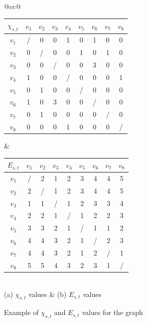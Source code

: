 \documentclass{sig-alternate}
\begin{document}
\begin{figure}[hbt]
    \center
    \begin{tabular}{@{}cc@{}}
        \begin{tabular}{|@{ }c@{ }|@{ }c@{ }c@{ }c@{ }c@{ }c@{ }c@{ }c@{ }c@{ }|}
            \hline
            $\chi_{s,t}$	& $v_1$	& $v_2$	& $v_3$	& $v_4$	& $v_5$	& $v_6$	& $v_7$ & $v_8$ \\\hline
            $v_1$			& /	& 0	& 0	& 1	& 0	& 1	& 0	& 0	 \\
            $v_2$			& 0	& /	& 0	& 0	& 1	& 0	& 1	& 0	 \\
            $v_3$			& 0	& 0	& /	& 0	& 0	& 3	& 0	& 0	 \\
            $v_4$			& 1	& 0	& 0	& /	& 0	& 0	& 0	& 1	 \\
            $v_5$			& 0	& 1	& 0	& 0	& /	& 0	& 0	& 0	 \\
            $v_6$			& 1	& 0	& 3	& 0	& 0	& /	& 0	& 0	 \\
            $v_7$			& 0	& 1	& 0	& 0	& 0	& 0	& / & 0  \\
            $v_8$			& 0	& 0	& 0	& 1	& 0	& 0	& 0 & /  \\
            \hline
        \end{tabular}
        &
        \begin{tabular}{|@{ }c@{ }|@{ }c@{ }c@{ }c@{ }c@{ }c@{ }c@{ }c@{ }c@{ }|}
            \hline
            $E_{s,t}$	& $v_1$	& $v_2$	& $v_3$	& $v_4$	& $v_5$	& $v_6$	& $v_7$	& $v_8$ \\\hline
            $v_1$			& /	& 2	& 1 & 2	& 3	& 4	& 4	& 5   \\
            $v_2$			& 2	& /	& 1	& 2	& 3	& 4	& 4	& 5   \\
            $v_3$			& 1	& 1	& /	& 1	& 2	& 3	& 3	& 4   \\
            $v_4$			& 2	& 2	& 1	& /	& 1	& 2	& 2	& 3   \\
            $v_5$			& 3	& 3	& 2	& 1	& /	& 1	& 1	& 2   \\
            $v_6$			& 4	& 4	& 3	& 2	& 1	& /	& 2	& 3   \\
            $v_7$			& 4	& 4	& 3	& 2	& 1	& 2	& /	& 1   \\
            $v_8$			& 5	& 5	& 4	& 3	& 2	& 3	& 1	& /   \\
            \hline
        \end{tabular} \\
        (a) $\chi_{s,t}$ values & (b) $E_{s,t}$ values
    \end{tabular}
    \caption{Example of $\chi_{s,t}$ and $E_{s,t}$ values for the graph}
\label{fig:freqcost}
\end{figure}
\end{document}
